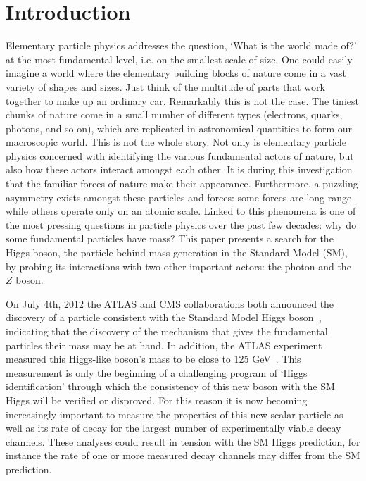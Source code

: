 \section{Introduction} %
Elementary particle physics addresses the question, `What is the world made of?' 
at the most fundamental level, i.e. on the smallest scale of size. 
One could easily imagine a world where the elementary building blocks of 
nature come in a vast variety of shapes and sizes. Just think of the multitude of 
parts that work together to make up an ordinary car. Remarkably this is not
the case. The tiniest chunks of nature come in a small number of different types
(electrons, quarks, photons, and so on), which are replicated in astronomical
quantities to form our macroscopic world. This is not the whole story.
Not only is elementary particle physics concerned with identifying the various 
fundamental actors of nature, but also how these actors interact amongst each other.
It is during this investigation that the familiar forces of nature make their
appearance. 
Furthermore, a puzzling asymmetry exists amongst these particles and forces:
some forces are long range while others operate only on an atomic
scale. Linked to this phenomena is one of the most pressing questions in particle
physics over the past few decades: why do some fundamental particles have mass?
This paper presents a search for the Higgs boson, the particle 
behind mass generation in the Standard Model (SM), by probing its interactions with 
two other important actors: the photon and the $Z$ boson.

On July 4th, 2012 the ATLAS and CMS collaborations both announced the 
discovery of a particle consistent with the 
Standard Model Higgs boson~\cite{ATLAS_Higgs,CMS_Higgs}, indicating that
the discovery of the mechanism that gives the fundamental particles their mass
may be at hand. In addition, the ATLAS experiment measured 
this Higgs-like boson's mass to be close to 125 GeV~\cite{ATLAS_Higgs_Dec12}.
This measurement is only the beginning of a challenging program of `Higgs
identification' through which the consistency of this new boson with the SM
Higgs will be verified or disproved. For this reason it is now becoming
increasingly important to measure the properties of this new scalar particle
as well as its rate of decay for the largest number of experimentally
viable decay channels. These analyses could result in tension with the SM
Higgs prediction, for instance the rate of one or more measured decay channels
may differ from the SM prediction. 

